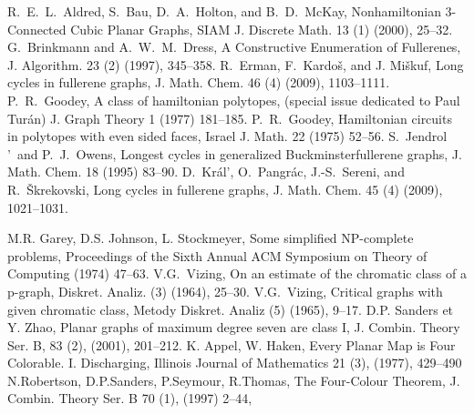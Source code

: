 \documentclass[10pt,a4paper]{article}
\begin{document}
\begin{thebibliography}{99}
 R.~E.~L.~Aldred, S.~Bau, D.~A.~Holton, and B.~D.~McKay,	
Nonhamiltonian 3-Connected Cubic Planar Graphs,
SIAM J. Discrete Math. 13 (1) (2000), 25--32.
 G.~Brinkmann and A.~W.~M.~Dress, A Constructive Enumeration of Fullerenes, J. Algorithm. 23 (2) (1997), 345--358.
 R.~Erman, F.~Kardo\v s, and J. Mi\v skuf, Long cycles in fullerene graphs, J. Math. Chem. 46 (4) (2009), 1103--1111.
 P.~R.~Goodey, A class of hamiltonian polytopes, (special issue dedicated to Paul Tur\'{a}n) J. Graph Theory 1 (1977) 181--185.
 P.~R.~Goodey, Hamiltonian circuits in polytopes with even sided faces, Israel J. Math. 22 (1975) 52--56.
 S.~Jendrol$\!$'~and P.~J.~Owens, {Longest cycles in generalized Buckminsterfullerene graphs}, J. Math. Chem. {18} (1995) 83--90.
 D.~Kr\'al$\!$', O.~Pangr\'ac, J.-S.~Sereni, and R.~\v Skrekovski, Long cycles in fullerene graphs, J. Math. Chem. 45 (4) (2009), 1021--1031.



 M.R. Garey, D.S. Johnson, L. Stockmeyer, Some simplified NP-complete problems, Proceedings of the Sixth Annual ACM Symposium on Theory of Computing (1974) 47--63.
 V.G.~Vizing, On an estimate of the chromatic class of a p-graph, Diskret. Analiz. (3) (1964), 25--30.
 V.G.~Vizing, Critical graphs with given chromatic class, Metody Diskret. Analiz (5) (1965), 9--17.
 D.P. Sanders et Y. Zhao, Planar graphs of maximum degree seven are class I, J. Combin. Theory Ser. B, {83} (2), (2001), 201--212.
 K. Appel, W. Haken, Every Planar Map is Four Colorable. I. Discharging, Illinois Journal of Mathematics 21 (3), (1977), 429--490
 N.Robertson, D.P.Sanders, P.Seymour, R.Thomas, The Four-Colour Theorem, J. Combin. Theory Ser. B 70 (1), (1997)  2--44,
\end{thebibliography}
\end{document}
